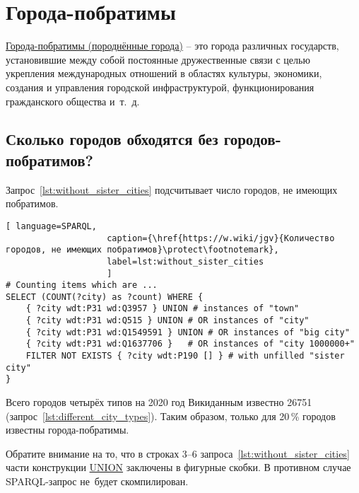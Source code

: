 \section{Города-побратимы}

\href{https://w.wiki/pRe}{Города-побратимы (породнённые города)} -- это города различных государств, установившие между собой постоянные дружественные связи с целью укрепления международных отношений в областях культуры, экономики, создания и управления городской инфраструктурой, 
функционирования гражданского общества и~т.~д.\autocite{sister_city}



\subsection{Сколько городов обходятся без городов-побратимов?}

Запрос~\ref{lst:without_sister_cities} подсчитывает число городов, не имеющих побратимов.

\begin{lstlisting}[ language=SPARQL, 
                    caption={\href{https://w.wiki/jgv}{Количество городов, не имеющих побратимов}\protect\footnotemark},
                    label=lst:without_sister_cities
                    ]
# Counting items which are ... 
SELECT (COUNT(?city) as ?count) WHERE {                             
	{ ?city wdt:P31 wd:Q3957 } UNION # instances of "town"          
	{ ?city wdt:P31 wd:Q515 } UNION # OR instances of "city"                 
	{ ?city wdt:P31 wd:Q1549591 } UNION # OR instances of "big city"                       
	{ ?city wdt:P31 wd:Q1637706 } 	# OR instances of "city 1000000+"              
	FILTER NOT EXISTS { ?city wdt:P190 [] } # with unfilled "sister city"
}
\end{lstlisting}

Всего городов четырёх типов на 2020 год Викиданным известно \num{26751} (запрос~\ref{lst:different_city_types}). 
Таким образом, только для 20\,\% городов известны города-побратимы.

Обратите внимание на то, что в строках 3--6 запроса~\ref{lst:without_sister_cities} 
части конструкции \href{https://en.wikibooks.org/wiki/SPARQL/UNION}{UNION} заключены в фигурные скобки. 
В противном случае SPARQL-запрос не~будет скомпилирован.



